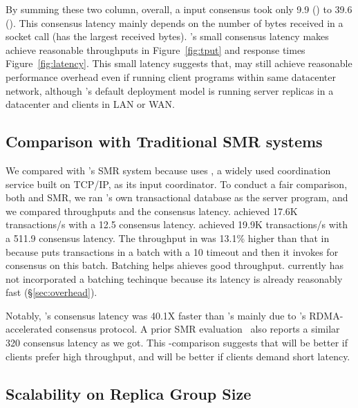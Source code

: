 By summing these two column, overall, a \xxx input consensus took only 9.9 \us 
(\redis) to 39.6 \us (\mongodb). This consensus latency mainly depends on the 
number of bytes received in a socket call (\mongodb has the largest received 
bytes). \xxx's small consensus latency makes \xxx achieve reasonable throughputs 
in Figure~\ref{fig:tput} and response times Figure~\ref{fig:latency}. This small 
latency suggests that, \xxx may still achieve reasonable performance overhead 
even if running client programs within same datacenter network, although \xxx's 
default deployment model is running server replicas in a datacenter and clients 
in LAN or WAN.

\subsection{Comparison with Traditional SMR systems} \label{sec:compare}

We compared \xxx with \calvin's SMR system because \calvin uses \zookeeper, a 
widely used coordination service built on TCP/IP, as its input coordinator. To 
conduct a fair comparison, both \xxx and \calvin SMR, we ran \calvin's own 
transactional database as the server program, and we compared throughputs and 
the consensus latency. \xxx achieved 17.6K transactions/s with a 12.5 \us 
consensus latency. \calvin achieved 19.9K transactions/s with a 511.9 \us 
consensus latency. The throughput in \calvin was 13.1\% higher than that in
\xxx because \calvin puts transactions in a batch with a 10 \ms timeout and 
then it invokes \zookeeper for consensus on this batch. Batching helps \calvin 
ahieves good throughput. \xxx currently has not incorporated a batching 
techinque because its latency is already reasonably fast 
(\S\ref{sec:overhead}).

Notably, \xxx's consensus latency was 40.1X faster than \zookeeper's mainly due 
to \xxx's RDMA-accelerated consensus protocol. A prior SMR
evaluation~\cite{dare:hpdc15} also reports a similar 320 \us \zookeeper 
consensus latency as we got. This \xxx-\calvin comparison suggests that \calvin 
will be better if clients prefer high throughput, and \xxx will be better if 
clients demand short latency.



\subsection{Scalability on Replica Group Size} \label{sec:scalability}

